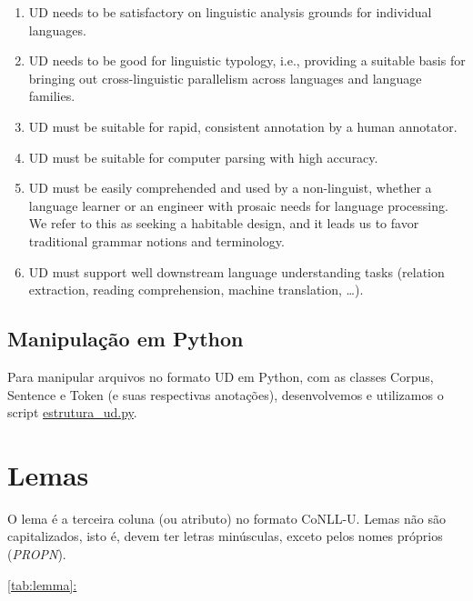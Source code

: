 \documentclass[output=paper,colorlinks,citecolor=brown]{langscibook}
\newcommand*{\fullref}[1]{\hyperref[{#1}]{\autoref*{#1}: \nameref*{#1}}} %
\begin{document}
	\begin{enumerate}
		\item UD needs to be satisfactory on linguistic analysis grounds for individual languages.
		\item UD needs to be good for linguistic typology, i.e., providing a suitable basis for bringing out cross-linguistic parallelism across languages and language families.
		\item UD must be suitable for rapid, consistent annotation by a human annotator.
		\item UD must be suitable for computer parsing with high accuracy.
		\item UD must be easily comprehended and used by a non-linguist, whether a language learner or an engineer with prosaic needs for language processing. We refer to this as seeking a habitable design, and it leads us to favor traditional grammar notions and terminology.
		\item UD must support well downstream language understanding tasks (relation extraction, reading comprehension, machine translation, …).
	\end{enumerate}


\section{Manipulação em Python}\label{sec:python}

	Para manipular arquivos no formato UD em Python, com as classes Corpus, Sentence e Token (e suas respectivas anotações), desenvolvemos e utilizamos o script \href{https://github.com/alvelvis/ACDC-UD#estrutura_udpy}{estrutura\_ud.py}.

\chapter{Lemas}\label{sec:lemas}

	O lema é a terceira coluna (ou atributo) no formato CoNLL-U. Lemas não são capitalizados, isto é, devem ter letras minúsculas, exceto pelos nomes próprios (\emph{PROPN}).

	\fullref{tab:lemma}
\end{document}
